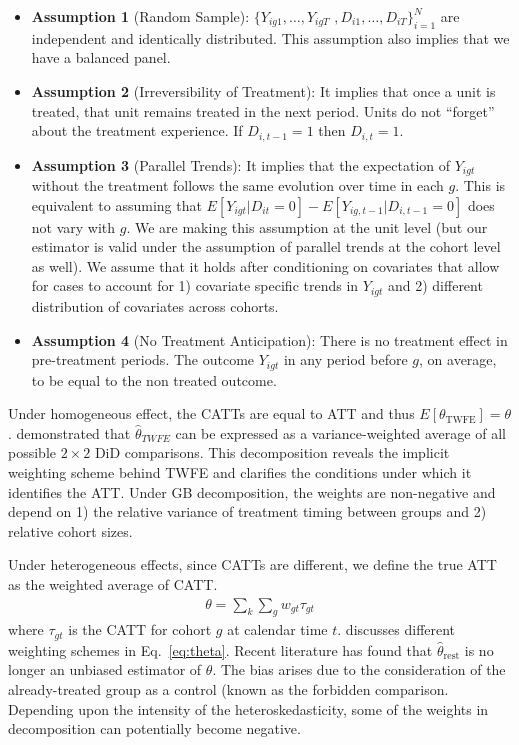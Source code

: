 \documentclass[margin=3in, 12pt]{article}
\newcommand{\1}{\mathbbm{1}}
\begin{document}
\begin{itemize}
    \item[] \textbf{Assumption 1} (Random Sample): $\{Y_{ig1},\dotsc,Y_{igT}$ $,D_{i1},\dotsc,D_{iT}\}_{i=1}^{N}$ are independent and identically distributed. This assumption also implies that we have a balanced panel.
    \item[] \textbf{Assumption 2} (Irreversibility of Treatment): It implies that once a unit is treated, that unit  remains treated in the next period. Units do not “forget” about the treatment experience. If $D_{i,t-1} = 1$ then $D_{i,t} = 1$.
    \item[] \textbf{Assumption 3} (Parallel Trends): It implies that the expectation of $Y_{igt}$ without the treatment follows the same evolution over time in each $g$. This is equivalent to assuming that $E[Y_{igt}|D_{it} = 0] - E[Y_{ig,t-1}|D_{i,t-1} = 0]$ does not vary with $g$. We are making this assumption at the unit level (but our estimator is valid under the assumption of parallel trends at the cohort level as well). We assume that it holds after conditioning on covariates that allow for cases to account for 1) covariate specific trends in $Y_{igt}$ and 2) different distribution of covariates across cohorts.
    \item[] \textbf{Assumption 4} (No Treatment Anticipation): There is no treatment effect in pre-treatment periods. The outcome $Y_{igt}$ in any period before $g$, on average, to be equal to the non treated outcome.
\end{itemize}
Under homogeneous effect, the CATTs are equal to ATT and thus $E[\theta_{\text{TWFE}}] = \theta$. \cite{goodman2021} demonstrated that $\hat\theta_{TWFE}$ can be expressed as a variance-weighted average of all possible $2 \times 2$ DiD comparisons. This decomposition reveals the implicit weighting scheme behind TWFE and clarifies the conditions under which it identifies the ATT. Under GB decomposition, the weights are non-negative and depend on 1) the relative variance of treatment timing between groups and 2) relative cohort sizes. 


Under heterogeneous effects, since CATTs are different, we define the true ATT as the weighted average of CATT.
\begin{eqnarray}
\label{eq:theta}
	\theta = \sum_k\sum_g w_{gt}\tau_{gt} 
\end{eqnarray}
where $\tau_{gt}$ is the CATT for cohort $g$ at calendar time $t$. \cite{callaway2021} discusses different weighting schemes in Eq.~\ref{eq:theta}. Recent literature has found that $\hat\theta_{\text{rest}}$ is no longer an unbiased estimator of $\theta$. The bias arises due to the consideration of the already-treated group as a control (known as the forbidden comparison. Depending upon the intensity of the heteroskedasticity, some of the weights in \cite{goodman2021} decomposition can potentially become negative.
\end{document}
